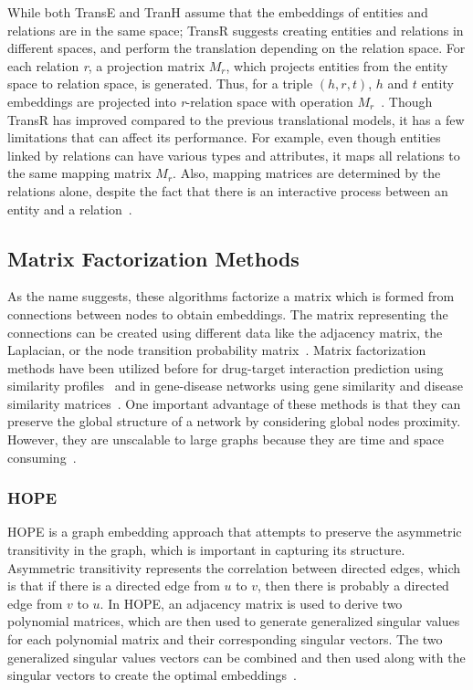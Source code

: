 While both TransE and TranH assume that the embeddings of entities and relations are in the same space; TransR suggests creating entities and relations in different spaces, and perform the translation depending on the relation space.
For each relation \textit{r}, a projection matrix $M_{r}$, which projects entities from the entity space to relation space, is generated.
Thus, for a triple $(h, r, t)$, $h$ and $t$ entity embeddings are projected into \textit{r}-relation space with operation $M_{r}$~\cite{lin_learning_2015}.
Though TransR has improved compared to the previous translational models, it has a few limitations that can affect its performance.
For example, even though entities linked by relations can have various types and attributes, it maps all relations to the same mapping matrix $M_{r}$.
Also, mapping matrices are determined by the relations alone, despite the fact that there is an interactive process between an entity and a relation~\cite{ji_knowledge_2015}.

\subsection{Matrix Factorization Methods}

As the name suggests, these algorithms factorize a matrix which is formed from connections between nodes to obtain embeddings.
The matrix representing the connections can be created using different data like the adjacency matrix, the Laplacian, or the node transition probability matrix~\cite{goyal_graph_2018}.
Matrix factorization methods have been utilized before for drug-target interaction prediction using similarity profiles~\cite{ezzat_drug-target_2017, yamanishi_dinies:_2014} and in gene-disease networks using gene similarity and disease similarity matrices~\cite{zeng_probability-based_2017}.
One important advantage of these methods is that they can preserve the global structure of a network by considering global nodes proximity.
However, they are unscalable to large graphs because they are time and space consuming~\cite{cai_comprehensive_2017}.

\subsubsection{HOPE}

\ac{HOPE} is a graph embedding approach that attempts to preserve the asymmetric transitivity in the graph, which is important in capturing its structure.
Asymmetric transitivity represents the correlation between directed edges, which is that if there is a directed edge from $u$ to $v$, then there is probably a directed edge from $v$ to $u$.
In \ac{HOPE}, an adjacency matrix is used to derive two polynomial matrices, which are then used to generate generalized singular values for each polynomial matrix and their corresponding singular vectors.
The two generalized singular values vectors can be combined and then used along with the singular vectors to create the optimal embeddings~\cite{ou_asymmetric_2016}.

